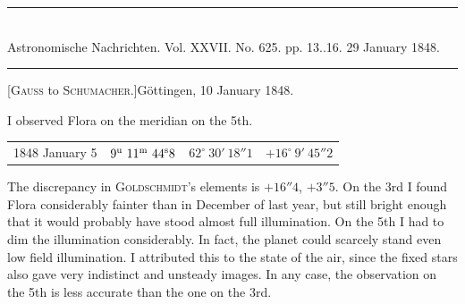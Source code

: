 \clearpage
\hypertarget{native-481-january10}{}
\begin{center}
\rule{0.55\linewidth}{0.4pt}\\[2pt]
Astronomische Nachrichten. Vol. XXVII. No. 625. pp. 13..16. 29 January 1848.\\[2pt]
\rule{0.55\linewidth}{0.4pt}
\end{center}
\begin{center}[\textsc{Gauss} to \textsc{Schumacher}.]\quad Göttingen, 10 January 1848.\end{center}

I observed Flora on the meridian on the 5th.

\begin{center}
\setlength{\tabcolsep}{4pt}
\begin{tabular}{l|r|r|r}
1848 January 5 & $9^{\rm u}\ 11^{\rm m}\ 44^{\rm s}8$ & $62^\circ\ 30'\ 18''1$ & $+16^\circ\ 9'\ 45''2$ \\
\end{tabular}
\end{center}

The discrepancy in \textsc{Goldschmidt}’s elements is $+16''4$, $+3''5$. On the 3rd I found Flora considerably fainter than in December of last year, but still bright enough that it would probably have stood almost full illumination. On the 5th I had to dim the illumination considerably. In fact, the planet could scarcely stand even low field illumination. I attributed this to the state of the air, since the fixed stars also gave very indistinct and unsteady images. In any case, the observation on the 5th is less accurate than the one on the 3rd.
